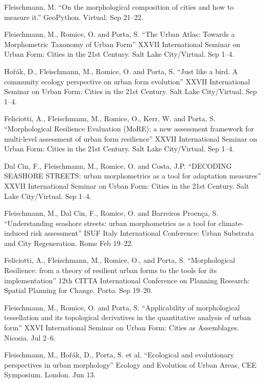 \documentclass[12pt,a4paper]{report}
\begin{document}
\begin{tablist}
        \item[2020] \tab{}Fleischmann, M. \enquote{On the morphological composition of cities and how to measure it.} GeoPython. Virtual. \@ Sep 21--22.

        \item[2020] \tab{}Fleischmann, M., Romice, O. and Porta, S. \enquote{The Urban Atlas: Towards a Morphometric Taxonomy of Urban Form} XXVII International Seminar on Urban Form: Cities in the 21st Century. Salt Lake City/Virtual. \@ Sep 1--4.

        \item[2020] \tab{}Hořák, D., Fleischmann, M., Romice, O. and Porta, S. \enquote{Just like a bird. A community ecology perspective on urban form evolution} XXVII International Seminar on Urban Form: Cities in the 21st Century. Salt Lake City/Virtual. \@ Sep 1--4.

        \item[2020] \tab{}Feliciotti, A., Fleischmann, M., Romice, O., Kerr, W. and Porta, S. \enquote{Morphological Resilience Evaluation (MoRE): a new assessment framework for multi-level assessment of urban form resilience} XXVII International Seminar on Urban Form: Cities in the 21st Century. Salt Lake City/Virtual. \@ Sep 1--4.

        \item[2020] \tab{}Dal Cin, F., Fleischmann, M., Romice, O. and Costa, J.P. \enquote{DECODING SEASHORE STREETS: urban morphometrics as a tool for adaptation measures} XXVII International Seminar on Urban Form: Cities in the 21st Century. Salt Lake City/Virtual. \@ Sep 1--4.

        \item[2020] \tab{}Fleischmann, M., Dal Cin, F., Romice, O. and Barreiros Proença, S. \enquote{Understanding seashore streets: urban morphometrics as a tool for climate-induced risk assessment} ISUF Italy International Conference: Urban Substrata and City Regeneration. Rome \@ Feb 19--22.

        \item[2019] \tab{}Feliciotti, A., Fleischmann, M., Romice, O., and Porta, S.  \enquote{Morphological Resilience: from a theory of resilient urban forms to the tools for its implementation} 12th CITTA International Conference on Planning Research: Spatial Planning for Change. Porto. \@ Sep 19--20.

        \item[2019] \tab{}Fleischmann, M., Romice, O. and Porta, S. \enquote{Applicability of morphological tessellation and its topological derivatives in the quantitative analysis of urban form} XXVI International Seminar on Urban Form: Cities as Assemblages. Nicosia. \@ Jul 2--6.

        \item[2019] \tab{}Fleischmann, M., Hořák, D., Porta, S. et al. \enquote{Ecological and evolutionary perspectives in urban morphology} Ecology and Evolution of Urban Areas, CEE Symposium. London. \@ Jun 13.


    \end{tablist}
\end{document}

